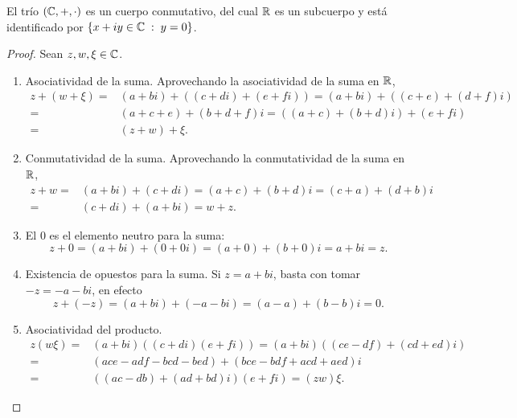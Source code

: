 \begin{prop}
	El trío $\displaystyle \left(\mathbb{C}, +, \cdot \right) $ es un cuerpo conmutativo, del cual $\displaystyle \mathbb{R} $ es un subcuerpo y está identificado por $\displaystyle \left\{ x + iy \in \mathbb{C} \; : \; y = 0\right\}  $.
\end{prop}
\begin{proof}
Sean $\displaystyle z,w,\xi \in \mathbb{C} $.
\begin{enumerate}
\item Asociatividad de la suma. Aprovechando la asociatividad de la suma en $\displaystyle \mathbb{R} $,
	\[
	\begin{split}
		z + \left(w + \xi \right) = & \left(a + bi\right) + \left(\left(c + di\right)+\left(e + fi\right)\right) = \left(a + bi\right)+\left(\left(c + e\right)+\left(d + f\right)i\right) \\
		= & \left(a + c + e\right) + \left(b + d + f\right)i= \left(\left(a + c\right)+\left(b + d\right)i\right)+\left(e + fi\right)\\
		= &  \left(z + w\right) + \xi .
	\end{split}
	\]
\item Conmutatividad de la suma. Aprovechando la conmutatividad de la suma en $\displaystyle \mathbb{R} $,
	\[
	\begin{split}
		z + w = & \left(a + bi\right)+\left(c + di\right)=\left(a + c\right) + \left(b + d\right)i = \left(c + a\right) + \left(d + b\right)i \\
		= & \left(c + di\right) + \left(a +bi\right)=w + z  .
	\end{split}
	\]
\item El $\displaystyle 0 $ es el elemento neutro para la suma:
	\[z + 0 = \left(a + bi\right) + \left(0 + 0i\right)= \left(a + 0\right)+\left(b+0\right)i = a + bi = z.\]
\item Existencia de opuestos para la suma. Si $\displaystyle z = a + bi $, basta con tomar $\displaystyle -z = -a-bi $, en efecto
	\[z + \left(-z\right)= \left(a + bi\right)+\left(-a-bi\right)=\left(a-a\right)+\left(b-b\right)i=0 .\]
\item Asociatividad del producto.
	\[
	\begin{split}
		z\left(w\xi\right) = & \left(a + bi\right)\left(\left(c+di\right)\left(e + fi\right)\right)=\left(a + bi\right)\left(\left(ce-df\right)+\left(cd+ed\right)i\right)\\
		= & \left(ace - adf -bcd - bed\right) + \left(bce - bdf + acd + aed\right)i \\
		= & \left(\left(ac-db\right)+\left(ad + bd\right)i\right)\left(e + fi\right) = \left(zw\right)\xi .

\end{split}\]
\end{enumerate}
\end{proof}
